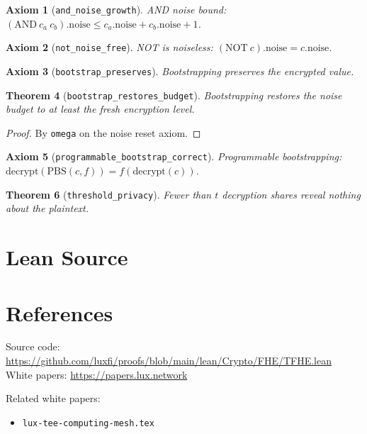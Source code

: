 \documentclass[11pt]{article}
\newtheorem{theorem}{Theorem}
\newtheorem{axiom_stmt}[theorem]{Axiom}
\begin{document}
\begin{axiom_stmt}[\texttt{and\_noise\_growth}]
AND noise bound: $(\text{AND}~c_a~c_b).\text{noise} \leq c_a.\text{noise} + c_b.\text{noise} + 1$.
\end{axiom_stmt}

\begin{axiom_stmt}[\texttt{not\_noise\_free}]
NOT is noiseless: $(\text{NOT}~c).\text{noise} = c.\text{noise}$.
\end{axiom_stmt}

\begin{axiom_stmt}[\texttt{bootstrap\_preserves}]
Bootstrapping preserves the encrypted value.
\end{axiom_stmt}

\begin{theorem}[\texttt{bootstrap\_restores\_budget}]
Bootstrapping restores the noise budget to at least the fresh encryption level.
\end{theorem}
\begin{proof}
By \texttt{omega} on the noise reset axiom.
\end{proof}

\begin{axiom_stmt}[\texttt{programmable\_bootstrap\_correct}]
Programmable bootstrapping: $\text{decrypt}(\text{PBS}(c, f)) = f(\text{decrypt}(c))$.
\end{axiom_stmt}

\begin{theorem}[\texttt{threshold\_privacy}]
Fewer than $t$ decryption shares reveal nothing about the plaintext.
\end{theorem}


\section{Lean Source}


\section{References}
\noindent Source code: \url{https://github.com/luxfi/proofs/blob/main/lean/Crypto/FHE/TFHE.lean}\\
\noindent White papers: \url{https://papers.lux.network}

\noindent Related white papers:
\begin{itemize}
  \item \texttt{lux-tee-computing-mesh.tex}
\end{itemize}
\end{document}
